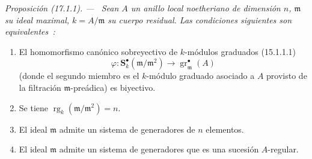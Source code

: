 \documentclass[10pt,oneside]{book}
\makeatletter
\newcommand{\setmanualcurrentlabel}[1]{\def\@currentlabel{#1}}
\newenvironment{proposition}[1][]{%
  \setmanualcurrentlabel{#1}\par\medskip\noindent\itshape Proposición (#1). ---\ }{\par}
\makeatother
\begin{document}
\begin{proposition}[17.1.1]
\label{0.17.1.1-es}
Sean $A$ un anillo local noetheriano de dimensión $n$, $\mathfrak{m}$ su
ideal maximal, $k=A/\mathfrak{m}$ su cuerpo residual. Las condiciones siguientes
son equivalentes~:
\begin{enumerate}
  \item[\rm a)] El homomorfismo canónico sobreyectivo de $k$-módulos graduados
  \textup{(15.1.1.1)}
  \[
    \varphi:\mathbf S^\bullet_k(\mathfrak{m}/\mathfrak{m}^2)
    \longrightarrow\operatorname{gr}^\bullet_{\mathfrak{m}}(A)
  \]
  (donde el segundo miembro es el $k$-módulo graduado asociado a $A$ provisto de
  la filtración $\mathfrak{m}$-preádica) es biyectivo.
  \item[\rm b)] Se tiene
  $\operatorname{rg}_k(\mathfrak{m}/\mathfrak{m}^2)=n$.
  \item[\rm c)] El ideal $\mathfrak{m}$ admite un sistema de generadores de $n$
  elementos.
  \item[\rm d)] El ideal $\mathfrak{m}$ admite un sistema de generadores que es
  una sucesión $A$-regular.
\end{enumerate}
\end{proposition}
\end{document}
